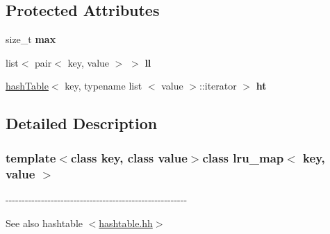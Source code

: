 \subsection*{\-Protected \-Attributes}
\begin{DoxyCompactItemize}
\item 
\hypertarget{classlru__map_a610e970e9bbdb5ace706301e04dbdc07}{size\-\_\-t {\bfseries max}}\label{classlru__map_a610e970e9bbdb5ace706301e04dbdc07}

\item 
\hypertarget{classlru__map_a5dca1b72d553fc82d00783f44e265a29}{list$<$ pair$<$ key, value $>$ $>$ {\bfseries ll}}\label{classlru__map_a5dca1b72d553fc82d00783f44e265a29}

\item 
\hypertarget{classlru__map_a725c63d2a23066a92d2b106720be6d38}{\hyperlink{classhashTable}{hash\-Table}$<$ key, typename list\*
$<$ value $>$\-::iterator $>$ {\bfseries ht}}\label{classlru__map_a725c63d2a23066a92d2b106720be6d38}

\end{DoxyCompactItemize}


\subsection{\-Detailed \-Description}
\subsubsection*{template$<$class key, class value$>$class lru\-\_\-map$<$ key, value $>$}

-\/-\/-\/-\/-\/-\/-\/-\/-\/-\/-\/-\/-\/-\/-\/-\/-\/-\/-\/-\/-\/-\/-\/-\/-\/-\/-\/-\/-\/-\/-\/-\/-\/-\/-\/-\/-\/-\/-\/-\/-\/-\/-\/-\/-\/-\/-\/-\/-\/-\/-\/-\/-\/-\/-\/-\/

\begin{DoxySeeAlso}{\-See also}
hashtable $<$\hyperlink{hashtable_8hh}{hashtable.\-hh}$>$ 
\end{DoxySeeAlso}


